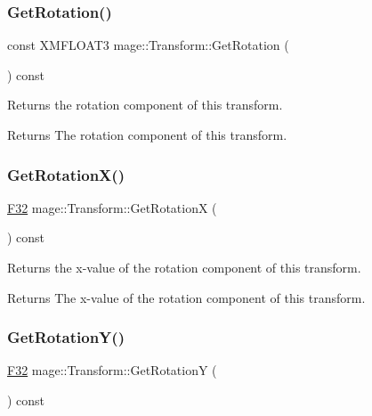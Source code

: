 \subsubsection{\texorpdfstring{Get\+Rotation()}{GetRotation()}}
{\footnotesize\ttfamily const X\+M\+F\+L\+O\+A\+T3 mage\+::\+Transform\+::\+Get\+Rotation (\begin{DoxyParamCaption}{ }\end{DoxyParamCaption}) const\hspace{0.3cm}{\ttfamily [noexcept]}}

Returns the rotation component of this transform.

\begin{DoxyReturn}{Returns}
The rotation component of this transform. 
\end{DoxyReturn}
\hypertarget{classmage_1_1_transform_ad3e1b49ccac234303ff28c8aea6f8e4a}{}\label{classmage_1_1_transform_ad3e1b49ccac234303ff28c8aea6f8e4a} 
\subsubsection{\texorpdfstring{Get\+Rotation\+X()}{GetRotationX()}}
{\footnotesize\ttfamily \hyperlink{namespacemage_aa97e833b45f06d60a0a9c4fc22ae02c0}{F32} mage\+::\+Transform\+::\+Get\+RotationX (\begin{DoxyParamCaption}{ }\end{DoxyParamCaption}) const\hspace{0.3cm}{\ttfamily [noexcept]}}

Returns the x-\/value of the rotation component of this transform.

\begin{DoxyReturn}{Returns}
The x-\/value of the rotation component of this transform. 
\end{DoxyReturn}
\hypertarget{classmage_1_1_transform_ac1962d03093b3671fcfb6a9b4f410628}{}\label{classmage_1_1_transform_ac1962d03093b3671fcfb6a9b4f410628} 
\subsubsection{\texorpdfstring{Get\+Rotation\+Y()}{GetRotationY()}}
{\footnotesize\ttfamily \hyperlink{namespacemage_aa97e833b45f06d60a0a9c4fc22ae02c0}{F32} mage\+::\+Transform\+::\+Get\+RotationY (\begin{DoxyParamCaption}{ }\end{DoxyParamCaption}) const\hspace{0.3cm}{\ttfamily [noexcept]}}

